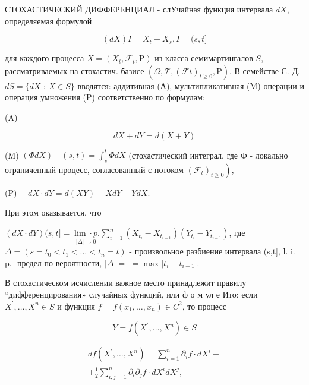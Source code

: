 \documentclass[10pt]{article}
\begin{document}
СТОХАСТИЧЕСКИЙ ДИФФЕРЕНЦИАЛ - слУчайная функция интервала $d X$, определяемая формулой



\[

(d X) I=X_{t}-X_{s}, I=(s, t]

\]



для каждого процесса $X=\left(X_{t}, \mathscr{F}_{t}, \mathrm{P}\right)$ из класса семимартингалов $S$, рассматриваемых на стохастич. базисе $\left(\Omega, \mathscr{T},(\mathscr{F} t)_{t \geqslant 0}, \mathrm{P}\right)$. В семействе С. Д. $d S=\{d X$ : $X \in S\}$ вводятся: аддитивная (А), мультипликативная (M) операции и операция умножения (P) соответственно по формулам:



(A)



\[

d X+d Y=d(X+Y)

\]



(M) $(\Phi d X) \quad(s, t)=\int_{s}^{t} \Phi d X$ (стохастический интеграл, где Ф - локально ограниченный процесс, согласованный с потоком $\left.\left(\mathscr{F}_{t}\right)_{t \geqslant 0}\right)$,



(P) $\quad d X \cdot d Y=d(X Y)-X d Y-Y d X$.



При этом оказывается, что



$(d X \cdot d Y)(s, t]=\underset{|\Delta| \rightarrow 0}{\lim \cdot p .} \sum_{i=1}^{n}\left(X_{t_{i}}-X_{t_{i-1}}\right)\left(Y_{t_{i}}-Y_{t_{i-1}}\right)$, где $\Delta=\left(s=t_{0}<t_{1}<\ldots<t_{n}=t\right)$ - произвольное разбиение интервала (s,t], l. i. p.- предел по вероятности, $|\Delta|=$ $=\max \left|t_{i}-t_{i-1}\right|$.



В стохастическом исчислении важное место принадлежит правилу “дифференцирования» случайных функций, или ф о м ул е Ито: если $X^{\prime}, \ldots, X^{n} \in S$ и функция $f=f\left(x_{1}, \ldots, x_{n}\right) \in C^{2}$, то процесс



\[

Y=f\left(X^{\prime}, \ldots, X^{n}\right) \in S

\]



\[

\begin{gathered}

d f\left(X^{\prime}, \ldots, X^{n}\right)=\sum_{i=1}^{n} \partial_{i} f \cdot d X^{i}+ \\

+\frac{1}{2} \sum_{i, j=1}^{n} \partial_{i} \partial_{j} f \cdot d X^{i} d X^{j},

\end{gathered}

\]
\end{document}
